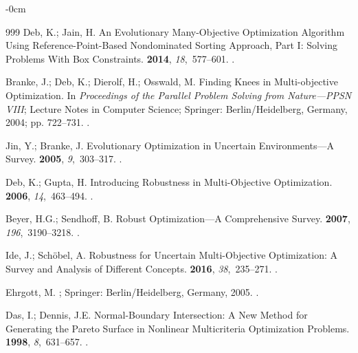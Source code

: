 \documentclass[systems,article,accept,moreauthors,pdftex]{Definitions/mdpi}
\begin{document}
\begin{adjustwidth}{-\extralength}{0cm}
\begin{thebibliography}{999}
Deb, K.; Jain, H.
\newblock An Evolutionary Many-Objective Optimization Algorithm Using
  Reference-Point-Based Nondominated Sorting Approach, Part {I}: Solving
  Problems With Box Constraints.
 {\bf 2014}, {\em
  18},~577--601.
.

Branke, J.; Deb, K.; Dierolf, H.; Osswald, M.
\newblock Finding Knees in Multi-objective Optimization.
\newblock In \emph{Proceedings of the Parallel Problem Solving from Nature---PPSN
  VIII}; Lecture Notes in Computer Science; Springer: Berlin/Heidelberg, Germany,  2004; 
  pp. 722--731.
.

Jin, Y.; Branke, J.
\newblock Evolutionary Optimization in Uncertain Environments---A Survey.
 {\bf 2005}, {\em
  9},~303--317.
.

Deb, K.; Gupta, H.
\newblock Introducing Robustness in Multi-Objective Optimization.
 {\bf 2006}, {\em 14},~463--494.
.

Beyer, H.G.; Sendhoff, B.
\newblock Robust Optimization---A Comprehensive Survey.
 {\bf
  2007}, {\em 196},~3190--3218.
.

Ide, J.; Sch{\"o}bel, A.
\newblock Robustness for Uncertain Multi-Objective Optimization: A Survey and
  Analysis of Different Concepts.
 {\bf 2016}, {\em 38},~235--271.
.

Ehrgott, M.
; Springer: Berlin/Heidelberg,
  Germany,  2005.
.

Das, I.; Dennis, J.E.
\newblock Normal-Boundary Intersection: A New Method for Generating the
  {Pareto} Surface in Nonlinear Multicriteria Optimization Problems.
 {\bf 1998}, {\em 8},~631--657.
.


\end{thebibliography}
\end{adjustwidth}
\end{document}
